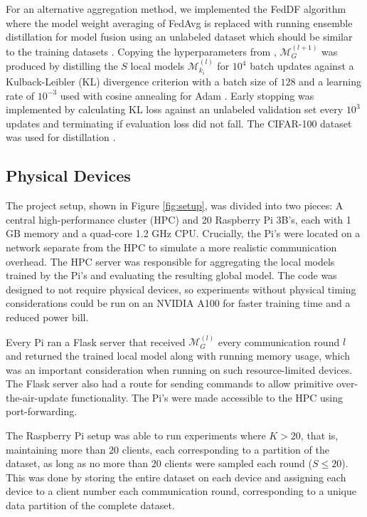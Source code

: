 \documentclass{article}
\begin{document}
For an alternative aggregation method, we implemented the FedDF algorithm where the model weight averaging of FedAvg is replaced with running ensemble distillation for model fusion using an unlabeled dataset which should be similar to the training datasets \cite{lin2020ensemble}.
Copying the hyperparameters from \cite{lin2020ensemble}, $\mathcal M_G^{(l + 1)}$ was produced by distilling the $S$ local models $\mathcal M_{k_i}^{(l)}$ for $10^4$ batch updates against a Kulback-Leibler (KL) divergence criterion with a batch size of $128$ and a learning rate of $10^{-3}$ used with cosine annealing for Adam \cite{losh2016sgdr,kingma2015adam}.
Early stopping was implemented by calculating KL loss against an unlabeled validation set every $10^3$ updates and terminating if evaluation loss did not fall.
The CIFAR-100 dataset was used for distillation \cite{alex2009learning}.

\subsection{Physical Devices}
The project setup, shown in Figure \ref{fig:setup}, was divided into two pieces: A central high-performance cluster (HPC) and 20 Raspberry Pi 3B's, each with 1 GB memory and a quad-core 1.2 GHz CPU.
Crucially, the Pi's were located on a network separate from the HPC to simulate a more realistic communication overhead.
The HPC server was responsible for aggregating the local models trained by the Pi's and evaluating the resulting global model.
The code was designed to not require physical devices, so experiments without physical timing considerations could be run on an NVIDIA A100 for faster training time and a reduced power bill.

Every Pi ran a Flask server that received $\mathcal M_G^{(l)}$ every communication round $l$ and returned the trained local model along with running memory usage, which was an important consideration when running on such resource-limited devices.
The Flask server also had a route for sending commands to allow primitive over-the-air-update functionality.
The Pi's were made accessible to the HPC using port-forwarding.

The Raspberry Pi setup was able to run experiments where $K > 20$, that is, maintaining more than 20 clients, each corresponding to a partition of the dataset, as long as no more than 20 clients were sampled each round ($S \leq 20$).
This was done by storing the entire dataset on each device and assigning each device to a client number each communication round, corresponding to a unique data partition of the complete dataset.
\end{document}
